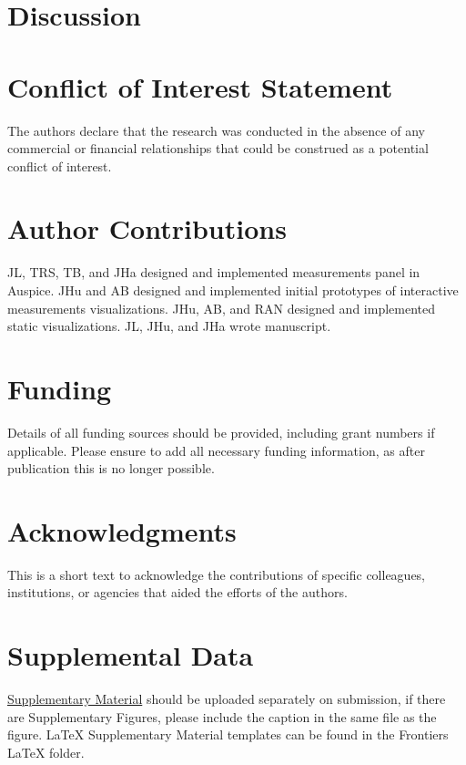 \documentclass[utf8]{FrontiersinHarvard} %
\begin{document}
\section{Discussion}

\section*{Conflict of Interest Statement}

The authors declare that the research was conducted in the absence of any commercial or financial relationships that could be construed as a potential conflict of interest.

\section*{Author Contributions}

JL, TRS, TB, and JHa designed and implemented measurements panel in Auspice.
JHu and AB designed and implemented initial prototypes of interactive measurements visualizations.
JHu, AB, and RAN designed and implemented static visualizations.
JL, JHu, and JHa wrote manuscript.

\section*{Funding}
Details of all funding sources should be provided, including grant numbers if applicable. Please ensure to add all necessary funding information, as after publication this is no longer possible.

\section*{Acknowledgments}
This is a short text to acknowledge the contributions of specific colleagues, institutions, or agencies that aided the efforts of the authors.

\section*{Supplemental Data}
 \href{http://home.frontiersin.org/about/author-guidelines#SupplementaryMaterial}{Supplementary Material} should be uploaded separately on submission, if there are Supplementary Figures, please include the caption in the same file as the figure. LaTeX Supplementary Material templates can be found in the Frontiers LaTeX folder.
\end{document}
